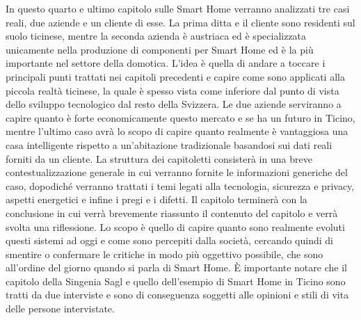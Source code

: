 In questo quarto e ultimo capitolo sulle Smart Home verranno analizzati tre casi reali, due aziende e un cliente di esse. La prima ditta e il cliente sono residenti sul suolo ticinese, mentre la seconda azienda è austriaca ed è specializzata unicamente nella produzione di componenti per Smart Home ed è la più importante nel settore della domotica. L’idea è quella di andare a toccare i principali punti trattati nei capitoli precedenti e capire come sono applicati alla piccola realtà ticinese, la quale è spesso vista come inferiore dal punto di vista dello sviluppo tecnologico dal resto della Svizzera. Le due aziende serviranno a capire quanto è forte economicamente questo mercato e se ha un futuro in Ticino, mentre l’ultimo caso avrà lo scopo di capire quanto realmente è vantaggiosa una casa intelligente rispetto a un’abitazione tradizionale basandosi sui dati reali forniti da un cliente. La struttura dei capitoletti consisterà in una breve contestualizzazione generale in cui verranno fornite le informazioni generiche del caso, dopodiché verranno trattati i temi legati alla tecnologia, sicurezza e privacy, aspetti energetici e infine i pregi e i difetti. Il capitolo terminerà con la conclusione in cui verrà brevemente riassunto il contenuto del capitolo e verrà svolta una riflessione. Lo scopo è quello di capire quanto sono realmente evoluti questi sistemi ad oggi e come sono percepiti dalla società, cercando quindi di smentire o confermare le critiche in modo più oggettivo possibile, che sono all’ordine del giorno quando si parla di Smart Home. È importante notare che il capitolo della Singenia Sagl e quello dell’esempio di Smart Home in Ticino sono tratti da due interviste e sono di conseguenza soggetti alle opinioni e stili di vita delle persone intervistate.